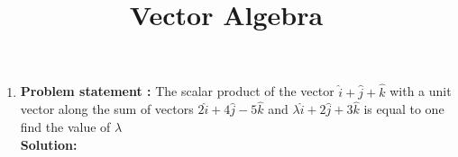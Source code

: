 \documentclass[12pt]{article}
\newcommand{\solution}{\noindent \textbf{Solution: }}
\begin{document}
\begin{center}
\title{\textbf{Vector Algebra}}
\date{\vspace{-5ex}} %
\maketitle
\end{center}


\begin{enumerate}
\item\textbf{Problem statement :} The scalar product of the vector $\hat{i}+\hat{j}+\hat{k}$ with a unit vector along the sum of vectors $2\hat{i}+4\hat{j}-5\hat{k}$ and $\lambda\hat{i}+2\hat{j}+3\hat{k}$ is equal to one find the value of $\lambda$
\\
\solution


\end{enumerate}
\end{document}
